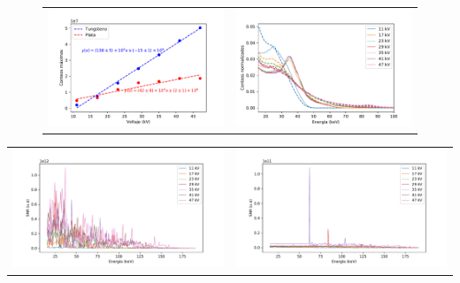 \documentclass{sciposter}
\begin{document}
\begin{multicols}{3}
	\begin{figure}[h]
		\centering
		\begin{tabular}{cc}
				\includegraphics[width = 0.52\linewidth]{Figuras/Max_voltage.pdf}
				&
				\includegraphics[width = 0.52\linewidth]{Figuras/Both_Normed.pdf}
		\end{tabular}
	\end{figure}
	
	\begin{table}[h]
		\centering
		\begin{tabular}{cc}
			\includegraphics[width = 0.52\linewidth]{Figuras/wsnr.pdf}
			&
			\includegraphics[width = 0.52\linewidth]{Figuras/agsnr.pdf}
		\end{tabular}
	\end{table}
	

\end{multicols}
\end{document}
